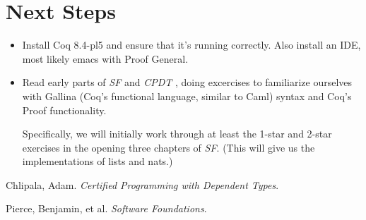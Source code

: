\documentclass{article}
\begin{document}
\begin{itemize}
\begin{itemize}
\end{itemize}

\section{Next Steps}
\begin{itemize}
  \item
    Install Coq 8.4-pl5 and ensure that it's running correctly.
    Also install an IDE, most likely emacs with Proof General.
  \item
    Read early parts of \emph{SF} \cite{sf} and \emph{CPDT} \cite{cpdt},
    doing excercises to familiarize ourselves with Gallina (Coq's functional
    language, similar to Caml) syntax and Coq's Proof functionality.

    Specifically, we will initially work through at least the 1-star and
    2-star exercises in the opening three chapters of \emph{SF}.
    (This will give us the implementations of lists and nats.)
\end{itemize}

\begin{thebibliography}{xx}
    Chlipala, Adam. \emph{Certified Programming with Dependent Types}.

    Pierce, Benjamin, et al. \emph{Software Foundations}.
\end{thebibliography}
\end{document}
